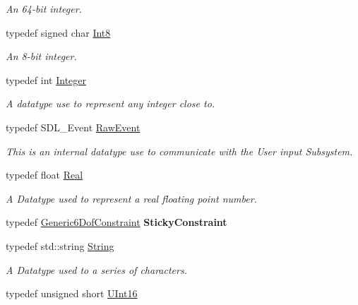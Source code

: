 \begin{DoxyCompactItemize}
\begin{DoxyCompactList}\small\item\em An 64-\/bit integer. \item\end{DoxyCompactList}\item 
typedef signed char \hyperlink{namespaceMezzanine_acbb048ee99aa07566d5a6eb33f5a2c2d}{Int8}
\begin{DoxyCompactList}\small\item\em An 8-\/bit integer. \item\end{DoxyCompactList}\item 
typedef int \hyperlink{namespaceMezzanine_ac3576e52af3c62d13dde94829e0c5465}{Integer}
\begin{DoxyCompactList}\small\item\em A datatype use to represent any integer close to. \item\end{DoxyCompactList}\item 
typedef SDL\_\-Event \hyperlink{namespaceMezzanine_ae8d4c0ab783af89a250b0225b75753e5}{RawEvent}
\begin{DoxyCompactList}\small\item\em This is an internal datatype use to communicate with the User input Subsystem. \item\end{DoxyCompactList}\item 
typedef float \hyperlink{namespaceMezzanine_a726731b1a7df72bf3583e4a97282c6f6}{Real}
\begin{DoxyCompactList}\small\item\em A Datatype used to represent a real floating point number. \item\end{DoxyCompactList}\item 
\hypertarget{namespaceMezzanine_aa85c09c031a0d343622fb297ff608108}{
typedef \hyperlink{classMezzanine_1_1Generic6DofConstraint}{Generic6DofConstraint} {\bfseries StickyConstraint}}
\label{namespaceMezzanine_aa85c09c031a0d343622fb297ff608108}

\item 
typedef std::string \hyperlink{namespaceMezzanine_acf9fcc130e6ebf08e3d8491aebcf1c86}{String}
\begin{DoxyCompactList}\small\item\em A Datatype used to a series of characters. \item\end{DoxyCompactList}\item 
\hypertarget{namespaceMezzanine_a1b6c09063432c7ddd87011c88306c767}{
typedef unsigned short \hyperlink{namespaceMezzanine_a1b6c09063432c7ddd87011c88306c767}{UInt16}}
\label{namespaceMezzanine_a1b6c09063432c7ddd87011c88306c767}


\end{DoxyCompactItemize}

